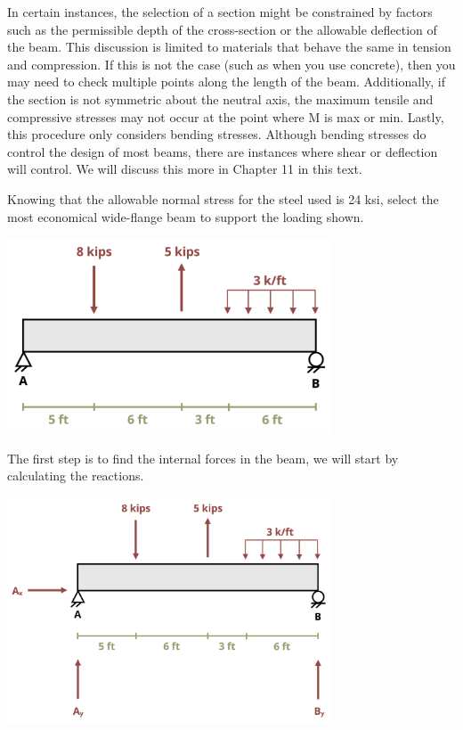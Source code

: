 \documentclass[
  letterpaper,
  DIV=11,
  numbers=noendperiod]{scrreprt}
\begin{document}
In certain instances, the selection of a section might be constrained by
factors such as the permissible depth of the cross-section or the
allowable deflection of the beam. This discussion is limited to
materials that behave the same in tension and compression. If this is
not the case (such as when you use concrete), then you may need to check
multiple points along the length of the beam. Additionally, if the
section is not symmetric about the neutral axis, the maximum tensile and
compressive stresses may not occur at the point where M is max or min.
Lastly, this procedure only considers bending stresses. Although bending
stresses do control the design of most beams, there are instances where
shear or deflection will control. We will discuss this more in Chapter
11 in this text.

\begin{tcolorbox}[enhanced jigsaw, colback=white, colframe=quarto-callout-note-color-frame, leftrule=.75mm, opacitybacktitle=0.6, colbacktitle=quarto-callout-note-color!10!white, arc=.35mm, bottomrule=.15mm, breakable, title={Example 9.3: Design\, of a Standard Steel Section}, left=2mm, titlerule=0mm, toptitle=1mm, toprule=.15mm, opacityback=0, rightrule=.15mm, coltitle=black, bottomtitle=1mm]

Knowing that the allowable normal stress for the steel used is 24 ksi,
select the most economical wide-flange beam to support the loading
shown.

\begin{center}
\includegraphics[width=3.79167in,height=\textheight]{images/CH9 PNGs/Example 9.3 part 1.png}
\end{center}

The first step is to find the internal forces in the beam, we will start
by calculating the reactions.

\begin{center}
\includegraphics[width=3.80208in,height=\textheight]{images/CH9 PNGs/Example 9.3 part 2.png}
\end{center}


\end{tcolorbox}
\end{document}
